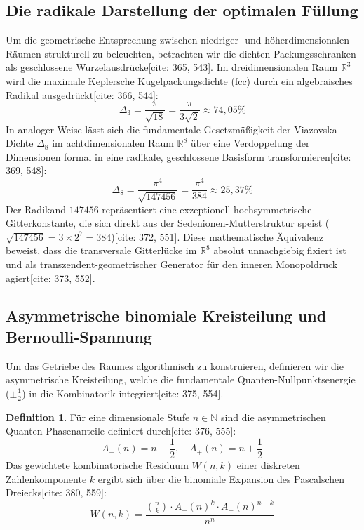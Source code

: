 \documentclass[11pt,a4paper]{article}
\newcommand{\R}{\mathbb{R}}
\theoremstyle{definition}
\newtheorem{definition}[theorem]{Definition}
\begin{document}
	\subsection{Die radikale Darstellung der optimalen Füllung}
	Um die geometrische Entsprechung zwischen niedriger- und höherdimensionalen Räumen strukturell zu beleuchten, betrachten wir die dichten Packungsschranken als geschlossene Wurzelausdrücke[cite: 365, 543]. Im dreidimensionalen Raum $\R^3$ wird die maximale Keplersche Kugelpackungsdichte ($\text{fcc}$) durch ein algebraisches Radikal ausgedrückt[cite: 366, 544]:
	\begin{equation}
		\Delta_3 = \frac{\pi}{\sqrt{18}} = \frac{\pi}{3\sqrt{2}} \approx 74{,}05\%
	\end{equation}
	In analoger Weise lässt sich die fundamentale Gesetzmäßigkeit der Viazovska-Dichte $\Delta_8$ im achtdimensionalen Raum $\R^8$ über eine Verdoppelung der Dimensionen formal in eine radikale, geschlossene Basisform transformieren[cite: 369, 548]:
	\begin{equation}
		\Delta_8 = \frac{\pi^4}{\sqrt{147456}} = \frac{\pi^4}{384} \approx 25{,}37\%
	\end{equation}
	Der Radikand $147456$ repräsentiert eine exzeptionell hochsymmetrische Gitterkonstante, die sich direkt aus der Sedenionen-Mutterstruktur speist ($\sqrt{147456} = 3 \times 2^7 = 384$)[cite: 372, 551]. Diese mathematische Äquivalenz beweist, dass die transversale Gitterlücke im $\R^8$ absolut unnachgiebig fixiert ist und als transzendent-geometrischer Generator für den inneren Monopoldruck agiert[cite: 373, 552].
	
	\subsection{Asymmetrische binomiale Kreisteilung und Bernoulli-Spannung}
	Um das Getriebe des Raumes algorithmisch zu konstruieren, definieren wir die asymmetrische Kreisteilung, welche die fundamentale Quanten-Nullpunktsenergie ($\pm \frac{1}{2}$) in die Kombinatorik integriert[cite: 375, 554].
	
	\begin{definition}
		Für eine dimensionale Stufe $n \in \mathbb{N}$ sind die asymmetrischen Quanten-Phasenanteile definiert durch[cite: 376, 555]:
		\begin{equation}
			A_-(n) = n - \frac{1}{2}, \quad A_+(n) = n + \frac{1}{2}
		\end{equation}
		Das gewichtete kombinatorische Residuum $W(n,k)$ einer diskreten Zahlenkomponente $k$ ergibt sich über die binomiale Expansion des Pascalschen Dreiecks[cite: 380, 559]:
		\begin{equation}
			W(n,k) = \frac{\binom{n}{k} \cdot A_-(n)^k \cdot A_+(n)^{n-k}}{n^n}
		\end{equation}
	\end{definition}
	
\end{document}
